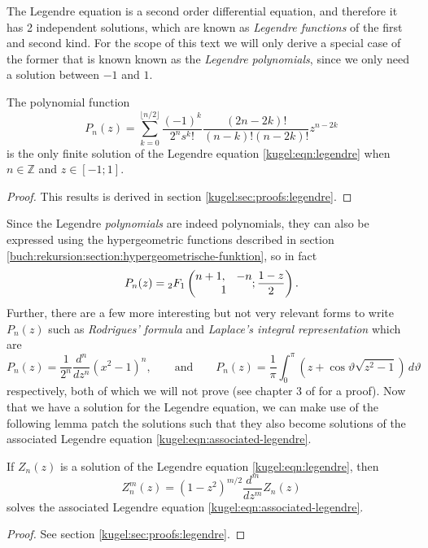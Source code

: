 The Legendre equation is a second order differential equation, and therefore it
has 2 independent solutions, which are known as \emph{Legendre functions} of the
first and second kind. For the scope of this text we will only derive a special
case of the former that is known known as the \emph{Legendre polynomials}, since
we only need a solution between $-1$ and $1$.

\begin{lemma}
  \label{kugel:thm:legendre-poly}
  The polynomial function
  \[
    P_n(z) = \sum^{\lfloor n/2 \rfloor}_{k=0}
      \frac{(-1)^k}{2^n s^k!} \frac{(2n - 2k)!}{(n - k)! (n-2k)!} z^{n - 2k}
  \]
  is the only finite solution of the Legendre equation
  \eqref{kugel:eqn:legendre} when $n \in \mathbb{Z}$ and $z \in [-1; 1]$.
\end{lemma}
\begin{proof}
  This results is derived in section \ref{kugel:sec:proofs:legendre}.
\end{proof}

Since the Legendre \emph{polynomials} are indeed polynomials, they can also be
expressed using the hypergeometric functions described in section
\ref{buch:rekursion:section:hypergeometrische-funktion}, so in fact
\begin{equation}
  P_n(z) = {}_2F_1 \left( \begin{matrix}
    n + 1, & -n \\ \multicolumn{2}{c}{1}
  \end{matrix} ; \frac{1 - z}{2} \right).
\end{equation}
Further, there are a few more interesting but not very relevant forms to write
$P_n(z)$ such as \emph{Rodrigues' formula} and \emph{Laplace's integral
representation} which are
\begin{equation*}
  P_n(z) = \frac{1}{2^n} \frac{d^n}{dz^n} (x^2 - 1)^n,
  \qquad \text{and} \qquad
  P_n(z) = \frac{1}{\pi} \int_0^\pi \left(
    z + \cos\vartheta \sqrt{z^2 - 1}
  \right) \, d\vartheta
\end{equation*}
respectively, both of which we will not prove (see chapter 3 of
\cite{bell_special_2004} for a proof). Now that we have a solution for the
Legendre equation, we can make use of the following lemma patch the solutions
such that they also become solutions of the associated Legendre equation
\eqref{kugel:eqn:associated-legendre}.

\begin{lemma} \label{kugel:thm:extend-legendre}
  If $Z_n(z)$ is a solution of the Legendre equation \eqref{kugel:eqn:legendre},
  then
  \begin{equation*}
    Z^m_n(z) = (1 - z^2)^{m/2} \frac{d^m}{dz^m}Z_n(z)
  \end{equation*}
  solves the associated Legendre equation \eqref{kugel:eqn:associated-legendre}.
  \nocite{bell_special_2004}
\end{lemma}
\begin{proof}
  See section \ref{kugel:sec:proofs:legendre}.
\end{proof}

